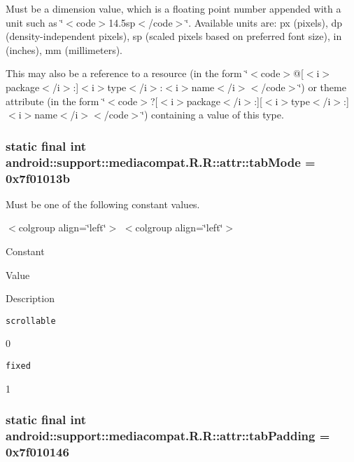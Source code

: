 Must be a dimension value, which is a floating point number appended with a unit such as \char`\"{}$<$code$>$14.5sp$<$/code$>$\char`\"{}. Available units are: px (pixels), dp (density-independent pixels), sp (scaled pixels based on preferred font size), in (inches), mm (millimeters). 

This may also be a reference to a resource (in the form \char`\"{}$<$code$>$@\mbox{[}$<$i$>$package$<$/i$>$:\mbox{]}$<$i$>$type$<$/i$>$:$<$i$>$name$<$/i$>$$<$/code$>$\char`\"{}) or theme attribute (in the form \char`\"{}$<$code$>$?\mbox{[}$<$i$>$package$<$/i$>$:\mbox{]}\mbox{[}$<$i$>$type$<$/i$>$:\mbox{]}$<$i$>$name$<$/i$>$$<$/code$>$\char`\"{}) containing a value of this type. \hypertarget{classandroid_1_1support_1_1mediacompat_1_1_r_1_1attr_661cda0b62daf802d7dae38e3a0f8985}{
\subsubsection[{tabMode}]{\setlength{\rightskip}{0pt plus 5cm}static final int android::support::mediacompat.R.R::attr::tabMode = 0x7f01013b}}
\label{classandroid_1_1support_1_1mediacompat_1_1_r_1_1attr_661cda0b62daf802d7dae38e3a0f8985}


Must be one of the following constant values. \begin{TabularC}{0}
\hline
\end{TabularC}
$<$colgroup align=\char`\"{}left\char`\"{}$>$ $<$colgroup align=\char`\"{}left\char`\"{}$>$ 

Constant

Value

Description 

{\tt scrollable}

0

{\tt fixed}

1\hypertarget{classandroid_1_1support_1_1mediacompat_1_1_r_1_1attr_9c0cda8fdb943fdc251abdd7085b0867}{
\subsubsection[{tabPadding}]{\setlength{\rightskip}{0pt plus 5cm}static final int android::support::mediacompat.R.R::attr::tabPadding = 0x7f010146}}
\label{classandroid_1_1support_1_1mediacompat_1_1_r_1_1attr_9c0cda8fdb943fdc251abdd7085b0867}


